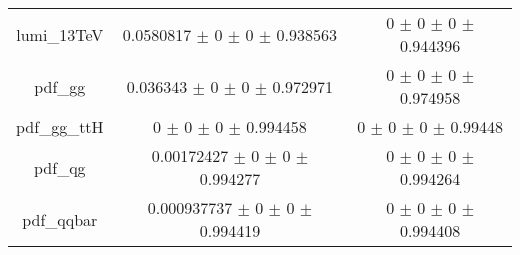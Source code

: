 \begin{table}
\begin{tabular}{ccc}
lumi\_13TeV & \num{0.0580817} $\pm$ \num{0} $\pm$ \num{0} $\pm$ \num{0.938563} & \num{0} $\pm$ \num{0} $\pm$ \num{0} $\pm$ \num{0.944396}\\
pdf\_gg & \num{0.036343} $\pm$ \num{0} $\pm$ \num{0} $\pm$ \num{0.972971} & \num{0} $\pm$ \num{0} $\pm$ \num{0} $\pm$ \num{0.974958}\\
pdf\_gg\_ttH & \num{0} $\pm$ \num{0} $\pm$ \num{0} $\pm$ \num{0.994458} & \num{0} $\pm$ \num{0} $\pm$ \num{0} $\pm$ \num{0.99448}\\
pdf\_qg & \num{0.00172427} $\pm$ \num{0} $\pm$ \num{0} $\pm$ \num{0.994277} & \num{0} $\pm$ \num{0} $\pm$ \num{0} $\pm$ \num{0.994264}\\
pdf\_qqbar & \num{0.000937737} $\pm$ \num{0} $\pm$ \num{0} $\pm$ \num{0.994419} & \num{0} $\pm$ \num{0} $\pm$ \num{0} $\pm$ \num{0.994408}\\
\bottomrule
\end{tabular}
\end{table}